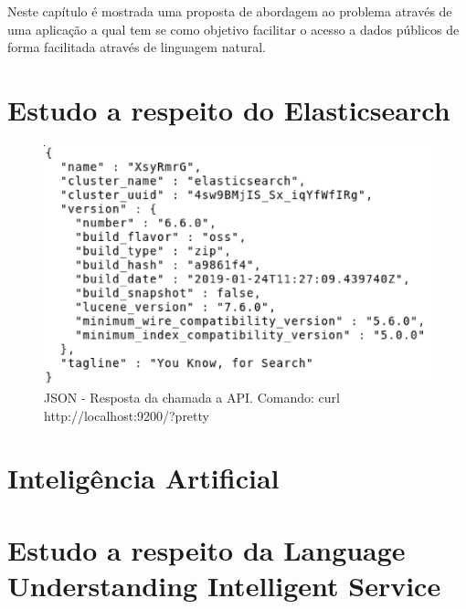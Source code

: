 Neste capítulo é mostrada uma proposta de abordagem ao problema através de uma aplicação a qual tem se como objetivo facilitar o acesso a dados públicos de forma facilitada através de linguagem natural.

\section{Estudo a respeito do Elasticsearch}


\begin{figure}[!htb]
	\caption{\label{pretty}JSON - Resposta da chamada a API. Comando: curl http://localhost:9200/?pretty}
	\begin{center}
		\includegraphics[width=\textwidth]{imagens/pretty.eps}
	\end{center}
\end{figure}

\section{Inteligência Artificial}


\section{Estudo a respeito da Language Understanding Intelligent Service}

